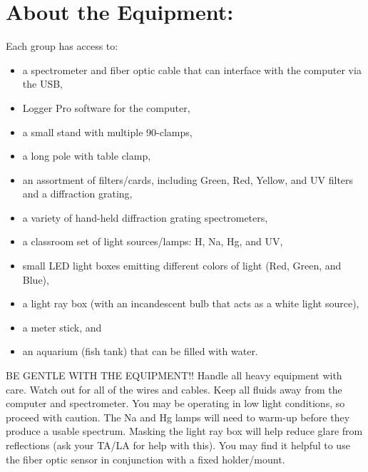 \section*{About the Equipment:}
Each group has access to:
\begin{itemize}
\itemsep-0.3em
\item a spectrometer and fiber optic cable that can interface with the computer via the USB,
\item Logger Pro software for the computer,
\item a small stand with multiple 90-clamps,
\item a long pole with table clamp,
\item an assortment of filters/cards, including Green, Red, Yellow, and UV filters and a diffraction grating,
\item a variety of hand-held diffraction grating spectrometers,
\item a classroom set of light sources/lamps: H, Na, Hg, and UV,
\item small LED light boxes emitting different colors of light (Red, Green, and Blue),
\item a light ray box (with an incandescent bulb that acts as a white light source),
\item a meter stick, and
\item an aquarium (fish tank) that can be filled with water.
\end{itemize}
BE GENTLE WITH THE EQUIPMENT!! 
Handle all heavy equipment with care. 
Watch out for all of the wires and cables. 
Keep all fluids away from the computer and spectrometer.
You may be operating in low light conditions, so proceed with caution. 
The Na and Hg lamps will need to warm-up before they produce a usable spectrum. 
Masking the light ray box will help reduce glare from reflections (ask your TA/LA for help with this). 
You may find it helpful to use the fiber optic sensor in conjunction with a fixed holder/mount.



